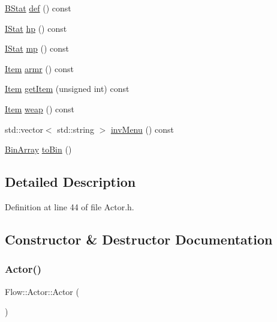 \begin{DoxyCompactItemize}
\hyperlink{class_flow_1_1_b_stat}{B\+Stat} \hyperlink{class_flow_1_1_actor_a745ae0efb3531935e92e0929b995cd96}{def} () const
\item 
\hyperlink{class_flow_1_1_i_stat}{I\+Stat} \hyperlink{class_flow_1_1_actor_aaea76048a01d31bfc82a0eeb53c5cbdb}{hp} () const
\item 
\hyperlink{class_flow_1_1_i_stat}{I\+Stat} \hyperlink{class_flow_1_1_actor_a197cf5bc7b1b24c4e557adbdc6d9bbdf}{mp} () const
\item 
\hyperlink{class_flow_1_1_item}{Item} \hyperlink{class_flow_1_1_actor_a7bb72f8323d7023e3ccac777a25e0966}{armr} () const
\item 
\hyperlink{class_flow_1_1_item}{Item} \hyperlink{class_flow_1_1_actor_ae7bcb5a227abb90a6850f15ec9cdd1e7}{get\+Item} (unsigned int) const
\item 
\hyperlink{class_flow_1_1_item}{Item} \hyperlink{class_flow_1_1_actor_ac3a62be0b16ee5c462dfb573b45d16b0}{weap} () const
\item 
std\+::vector$<$ std\+::string $>$ \hyperlink{class_flow_1_1_actor_aec57f78aa7e423c35b6b8addbe0aa46f}{inv\+Menu} () const
\item 
\hyperlink{class_flow_1_1_bin_array}{Bin\+Array} \hyperlink{class_flow_1_1_actor_a2252bd864b45e784daaa9f8ecf7ba276}{to\+Bin} ()
\end{DoxyCompactItemize}


\subsection{Detailed Description}


Definition at line 44 of file Actor.\+h.



\subsection{Constructor \& Destructor Documentation}
\hypertarget{class_flow_1_1_actor_a242b634b62029fb8fc3226e6dae85606}{}\label{class_flow_1_1_actor_a242b634b62029fb8fc3226e6dae85606} 
\subsubsection{\texorpdfstring{Actor()}{Actor()}\hspace{0.1cm}{\footnotesize\ttfamily [1/3]}}
{\footnotesize\ttfamily Flow\+::\+Actor\+::\+Actor (\begin{DoxyParamCaption}{ }\end{DoxyParamCaption})}



